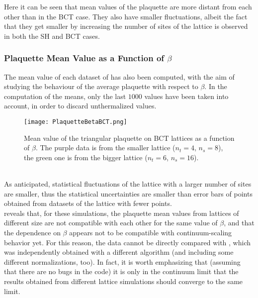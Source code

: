 Here it can be seen that mean values of the plaquette are more distant from each other than in the BCT case.
They also have smaller fluctuations, albeit the fact that they get smaller by increasing the number of sites of the lattice is observed in both the SH and BCT cases.

\subsubsection{Plaquette Mean Value as a Function of $\beta$}
The mean value of each dataset of  has also been computed, with the aim of studying the behaviour of the average plaquette with respect to $\beta$.
In the computation of the means, only the last $1000$ values have been taken into account, in order to discard unthermalized values.
\begin{figure}[!htbp]
    \centering
    \texttt{[image: PlaquetteBetaBCT.png]}
    \caption{Mean value of the triangular plaquette on BCT lattices as a function of $\beta$. The purple data is from the smaller lattice ($n_t=4$, $n_s=8$), the green one is from the bigger lattice ($n_t=6$, $n_s=16$).}
    \label{4F:PlaqBetaBCT}
\end{figure}\\
As anticipated, statistical fluctuations of the lattice with a larger number of sites are smaller, thus the statistical uncertainties are smaller than error bars of points obtained from datasets of the lattice with fewer points.\\
 reveals that, for these simulations, the plaquette mean values from lattices of different size are not compatible with each other for the same value of $\beta$, and that the dependence on $\beta$ appears not to be compatible with continuum-scaling behavior yet.
For this reason, the data cannot be directly compared with , which was independently obtained with a different algorithm (and including some different normalizations, too).
In fact, it is worth emphasizing that (assuming that there are no bugs in the code) it is only in the continuum limit that the results obtained from different lattice simulations should converge to the same limit.

